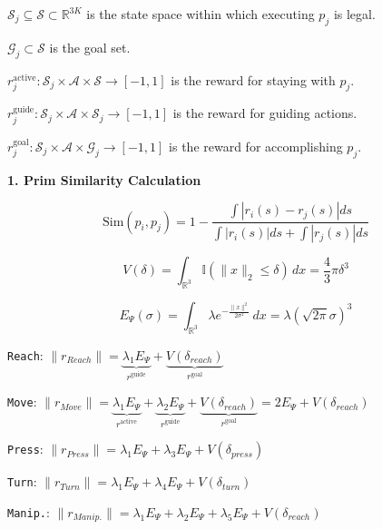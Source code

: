\documentclass{article}
\begin{document}
$\mathcal{S}_j \subseteq \mathcal{S} \subset \mathbb{R}^{3K}$
is the state space within which executing $p_j$ is legal.

$\mathcal{G}_j \subset \mathcal{S}$ is the goal set.

$r_j^{\text{active}}: \mathcal{S}_j \times \mathcal{A} \times \mathcal{S} \to [-1, 1]$ is the reward for staying with $p_j$.

$r_j^{\text{guide}}: \mathcal{S}_j \times \mathcal{A} \times \mathcal{S}_j \to [-1, 1]$ is the reward for guiding actions. 

$r_j^{\text{goal}}: \mathcal{S}_j \times \mathcal{A} \times \mathcal{G}_j \to [-1, 1]$ is the reward for accomplishing $p_j$.


\textbf{1. Prim Similarity Calculation}


$$\text{Sim}(p_i, p_j) = 1 - \frac{\int |r_i(s) - r_j(s)| ds}{\int |r_i(s)| ds + \int |r_j(s)| ds}$$

$$V(\delta) = \int_{\mathbb{R}^3} \mathbb{I}(\|x\|_2 \le \delta) \, dx = \frac{4}{3}\pi \delta^3$$

$$E_\Psi(\sigma) = \int_{\mathbb{R}^3} \lambda e^{-\frac{\|x\|^2}{2\sigma^2}} \, dx = \lambda (\sqrt{2\pi}\sigma)^3$$


\texttt{Reach}:  $\|r_{Reach}\| = \underbrace{ \lambda_1 E_{\Psi}}_{r^{\text{guide}}} + \underbrace{V(\delta_{reach})}_{r^{\text{goal}}}$

\texttt{Move}: $\|r_{Move}\| = \underbrace{ \lambda_1 E_{\Psi}}_{r^{\text{active}}} + \underbrace{\lambda_2 E_{\Psi}}_{r^{\text{guide}}} + \underbrace{V(\delta_{reach})}_{r^{\text{goal}}} = 2E_{\Psi} + V(\delta_{reach})$

\texttt{Press}: $\|r_{Press}\| = \lambda_1 E_{\Psi} + \lambda_3 E_{\Psi} +V(\delta_{press})$

\texttt{Turn}: $\|r_{Turn}\| = \lambda_1 E_{\Psi} + \lambda_4 E_{\Psi} + V(\delta_{turn})$

\texttt{Manip.}: $\|r_{Manip.}\| = \lambda_1 E_{\Psi} + \lambda_2 E_{\Psi} + \lambda_5 E_{\Psi} + V(\delta_{reach})$
\end{document}
